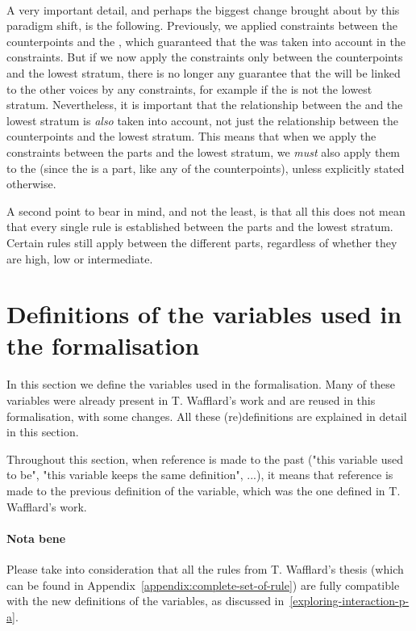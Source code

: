 \paragraph{}
A very important detail, and perhaps the biggest change brought about by this paradigm shift, is the following. Previously, we applied constraints between the counterpoints and the \cf, which guaranteed that the \cfs was taken into account in the constraints. But if we now apply the constraints only between the counterpoints and the lowest stratum, there is no longer any guarantee that the \cfs will be linked to the other voices by any constraints, for example if the \cfs is not the lowest stratum. Nevertheless, it is important that the relationship between the \cfs and the lowest stratum is \textit{also} taken into account, not just the relationship between the counterpoints and the lowest stratum. This means that when we apply the constraints between the parts and the lowest stratum, we \textit{must} also apply them to the \cfs (since the \cfs is a part, like any of the counterpoints), unless explicitly stated otherwise. 

A second point to bear in mind, and not the least, is that all this does not mean that every single rule is established between the parts and the lowest stratum. Certain rules still apply between the different parts, regardless of whether they are high, low or intermediate.

\section{Definitions of the variables used in the formalisation} \label{section:changes induced}
In this section we define the variables used in the formalisation. Many of these variables were already present in T. Wafflard's work and are reused in this formalisation, with some changes. All these (re)definitions are explained in detail in this section.

Throughout this section, when reference is made to the past ("this variable used to be", "this variable keeps the same definition", ...), it means that reference is made to the previous definition of the variable, which was the one defined in T. Wafflard's work.

\paragraph{Nota bene}
Please take into consideration that all the rules from T. Wafflard's thesis (which can be found in Appendix~\ref{appendix:complete-set-of-rule}) are fully compatible with the new definitions of the variables, as discussed in~\ref{exploring-interaction-p-a}. 

